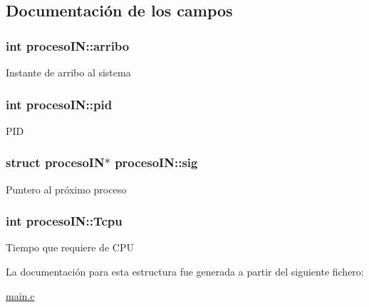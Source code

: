 \subsection{Documentación de los campos}
\hypertarget{structprocesoIN_a7a179c23dee4ce77f77d83059d1a6559}{
\subsubsection[{arribo}]{\setlength{\rightskip}{0pt plus 5cm}int proceso\-I\-N\-::arribo}}\label{structprocesoIN_a7a179c23dee4ce77f77d83059d1a6559}
Instante de arribo al sistema \hypertarget{structprocesoIN_a1f98173923093415811c68330209846b}{
\subsubsection[{pid}]{\setlength{\rightskip}{0pt plus 5cm}int proceso\-I\-N\-::pid}}\label{structprocesoIN_a1f98173923093415811c68330209846b}
P\-I\-D \hypertarget{structprocesoIN_a965fc90480b32b05d2760bf28923c570}{
\subsubsection[{sig}]{\setlength{\rightskip}{0pt plus 5cm}struct {\bf proceso\-I\-N}$\ast$ proceso\-I\-N\-::sig}}\label{structprocesoIN_a965fc90480b32b05d2760bf28923c570}
Puntero al próximo proceso \hypertarget{structprocesoIN_afd693c15ca8466745ab5a5bf21ef71dd}{
\subsubsection[{Tcpu}]{\setlength{\rightskip}{0pt plus 5cm}int proceso\-I\-N\-::\-Tcpu}}\label{structprocesoIN_afd693c15ca8466745ab5a5bf21ef71dd}
Tiempo que requiere de C\-P\-U 

La documentación para esta estructura fue generada a partir del siguiente fichero\-:\begin{DoxyCompactItemize}
\item 
\hyperlink{main_8c}{main.\-c}\end{DoxyCompactItemize}
